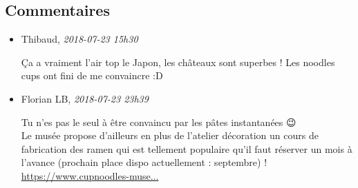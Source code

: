 \hypertarget{commentaires}{%
\subsection{Commentaires}\label{commentaires}}

\begin{itemize}
\item
  Thibaud, \emph{2018-07-23 15h30}

  Ça a vraiment l'air top le Japon, les châteaux sont superbes ! Les
  noodles cups ont fini de me convaincre :D
\item
  Florian LB, \emph{2018-07-23 23h39}

  Tu n'es pas le seul à être convaincu par les pâtes instantanées 😉\\
  Le musée propose d'ailleurs en plus de l'atelier décoration un cours
  de fabrication des ramen qui est tellement populaire qu'il faut
  réserver un mois à l'avance (prochain place dispo actuellement :
  septembre) !
  \href{https://www.cupnoodles-museum.jp/reservation/osaka_ikeda/}{https://www.cupnoodles-muse...}
\end{itemize}
